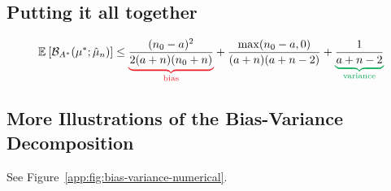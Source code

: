 \documentclass{article}
\newcommand*{\expect}[2][]{\ensuremath{\mathbb{E}_{#1} \left[ #2 \right] }} %
\newcommand{\logpart}{A}
\newcommand{\bregmanconj}{\cB_{\logpart^*}}
\begin{document}
\subsection{Putting it all together}
\begin{example}
\begin{align}
	\expect{\bregmanconj(\mu^* ; \hat \mu_n)} 
	\leq \bias{\frac{(n_0-a)^2}{2(a+n)(n_0+n)}}
	+ \frac{\max(n_0 - a , 0)}{(a+n)(a+n-2)}
	+ \variance{\frac{1}{a+n-2}}
\end{align}
\end{example}

\subsection{More Illustrations of the Bias-Variance Decomposition}
See Figure~\ref{app:fig:bias-variance-numerical}.
\end{document}
